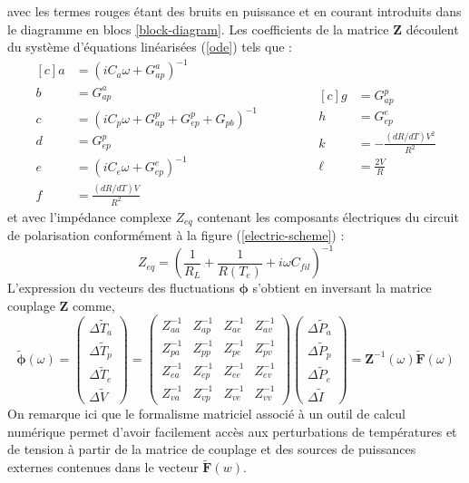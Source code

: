 avec les termes rouges étant des bruits en puissance et en courant introduits dans le diagramme en blocs \ref{block-diagram}. Les coefficients de la matrice $\bm{Z}$ découlent du système d'équations linéarisées (\ref{ode}) tels que :
\begin{equation}
\begin{aligned}[c]
a &=(i C_a \omega + G_{ap}^a)^{-1} \\
b &=G_{ap}^a \\
c &=(i C_p \omega + G_{ap}^p + G_{ep}^p + G_{pb})^{-1} \\
d &=G_{ep}^p \\
e &=(i C_e \omega + G_{ep}^e)^{-1}\\
f &=\frac{(dR/dT) V}{R^2} 
\end{aligned}
\qquad \qquad
\begin{aligned}[c]
g &=G_{ap}^p \\
h &=G_{ep}^e \\
k &=- \frac{(dR/dT) V^{2}}{R^{2}} \\
\ell &=\frac{2 V}{R}
\end{aligned}
\label{coef}
\end{equation}
et avec l'impédance complexe $Z_{eq}$ contenant les composants électriques du circuit de polarisation conformément à la figure (\ref{electric-scheme}) :
\begin{equation}
Z_{eq} = \left(\frac{1}{R_L} + \frac{1}{R(T_e)} + i\omega C_{fil}\right)^{-1}
\end{equation}
L'expression du vecteurs des fluctuations $\bm{\phi}$ s'obtient en inversant la matrice couplage $\bm{Z}$ comme, 
\begin{equation}
\bm{\tilde{\phi}} (\omega) =
\left( \begin{array}{c}
\Delta \tilde{T}_a\\
\Delta \tilde{T}_p\\
\Delta \tilde{T}_e\\
\Delta \tilde{V}
\end{array} \right)
=
\left( \begin{array}{cccc}
 Z_{aa}^{-1}&Z_{ap}^{-1}&Z_{ae}^{-1}&Z_{av}^{-1} \\
 Z_{pa}^{-1}&Z_{pp}^{-1}&Z_{pe}^{-1}&Z_{pv}^{-1}\\
 Z_{ea}^{-1}&Z_{ep}^{-1}&Z_{ee}^{-1}&Z_{ev}^{-1}\\
 Z_{va}^{-1}&Z_{vp}^{-1}&Z_{ve}^{-1}&Z_{vv}^{-1}
\end{array} \right)
\left( \begin{array}{c}
\Delta \tilde{P}_a\\
\Delta \tilde{P}_p\\
\Delta \tilde{P}_e\\
\Delta \tilde{I}
\end{array} \right)
= \bm{Z}^{-1}(\omega) \bm{\tilde{F}} (\omega)
\end{equation}
On remarque ici que le formalisme matriciel associé à un outil de calcul numérique permet d'avoir facilement accès aux perturbations de températures et de tension à partir de la matrice de couplage et des sources de puissances externes contenues dans le vecteur $\bm{\tilde{F}}(w)$.

